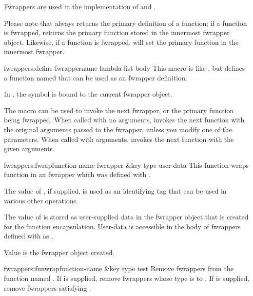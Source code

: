 Fwrappers are used in the implementation of  and
.

Please note that  always returns the primary
definition of a function; if a function is fwrapped,
 returns the primary function stored in the
innermost fwrapper object.  Likewise, if a function is fwrapped,
 will set the primary function in the
innermost fwrapper.

\begin{defmac}{fwrappers:}{define-fwrapper}{name lambda-list \ampbody body}
  This macro is like , but defines a function named
   that can be used as an fwrapper definition.
  
  In , the symbol  is bound to the current
  fwrapper object.

  The macro  can be used to invoke the next
  fwrapper, or the primary function being fwrapped.  When called
  with no arguments,  invokes the next
  function with the original arguments passed to the fwrapper, unless
  you modify one of the parameters.  When called with arguments,
   invokes the next function with the given
  arguments.
\end{defmac}

\begin{defun}{fwrappers:}{fwrap}{function-name fwrapper \&key type
    user-data}
  This function wraps function  in an fwrapper
   which was defined with .

  The value of , if supplied, is used as an identifying
  tag that can be used in various other operations.
  
  The value of  is stored as user-supplied data in the
  fwrapper object that is created for the function encapsulation.
  User-data is accessible in the body of fwrappers defined with
   as .

  Value is the fwrapper object created.
\end{defun}

\begin{defun}{fwrappers:}{funwrap}{function-name \&key type test}
  Remove fwrappers from the function named .  If
   is supplied, remove fwrappers whose type is 
  to .  If  is supplied, remove fwrappers
  satisfying .
\end{defun}

